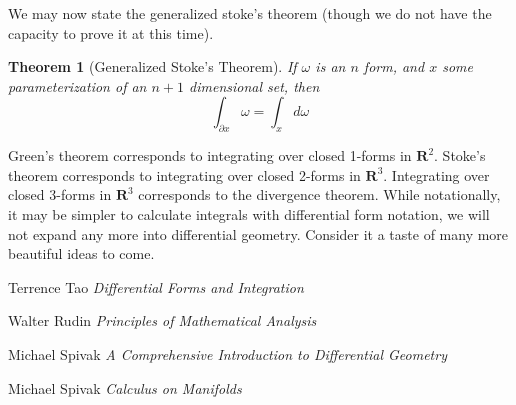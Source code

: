 \documentclass[12pt]{amsbook}
\theoremstyle{plain}
\newtheorem{theorem}{Theorem}
\theoremstyle{definition}
\begin{document}
We may now state the generalized stoke's theorem (though we do not have the capacity to prove it at this time).
%
\begin{theorem}[Generalized Stoke's Theorem]
    If $\omega$ is an $n$ form, and $x$ some parameterization of an $n+1$ dimensional set, then
    \[ \int_{\partial x} \omega = \int_x d\omega \]
\end{theorem}
%
Green's theorem corresponds to integrating over closed 1-forms in $\mathbf{R}^2$. Stoke's theorem corresponds to integrating over closed 2-forms in $\mathbf{R}^3$. Integrating over closed 3-forms in $\mathbf{R}^3$ corresponds to the divergence theorem. While notationally, it may be simpler to calculate integrals with differential form notation, we will not expand any more into differential geometry. Consider it a taste of many more beautiful ideas to come.

\begin{thebibliography}{12}

 Terrence Tao
\emph{Differential Forms and Integration}

 Walter Rudin
\emph{Principles of Mathematical Analysis}

 Michael Spivak
\emph{A Comprehensive Introduction to Differential Geometry}

 Michael Spivak
\emph{Calculus on Manifolds}

\end{thebibliography}
\end{document}
